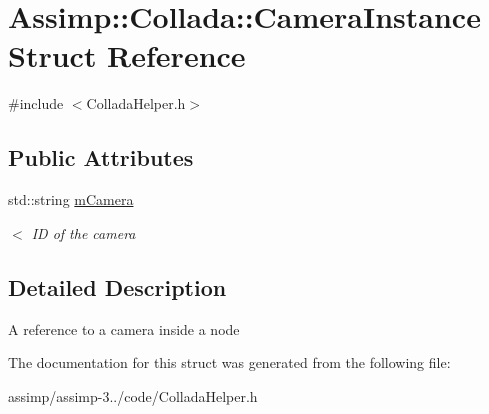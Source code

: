 \hypertarget{struct_assimp_1_1_collada_1_1_camera_instance}{\section{Assimp\+:\+:Collada\+:\+:Camera\+Instance Struct Reference}
\label{struct_assimp_1_1_collada_1_1_camera_instance}
}


{\ttfamily \#include $<$Collada\+Helper.\+h$>$}

\subsection*{Public Attributes}
\begin{DoxyCompactItemize}
\item 
\hypertarget{struct_assimp_1_1_collada_1_1_camera_instance_a681527447f868932a70b4f0d3548e1d8}{std\+::string \hyperlink{struct_assimp_1_1_collada_1_1_camera_instance_a681527447f868932a70b4f0d3548e1d8}{m\+Camera}}\label{struct_assimp_1_1_collada_1_1_camera_instance_a681527447f868932a70b4f0d3548e1d8}

\begin{DoxyCompactList}\small\item\em $<$ I\+D of the camera \end{DoxyCompactList}\end{DoxyCompactItemize}


\subsection{Detailed Description}
A reference to a camera inside a node 

The documentation for this struct was generated from the following file\+:\begin{DoxyCompactItemize}
\item 
assimp/assimp-\/3../code/Collada\+Helper.\+h\end{DoxyCompactItemize}
